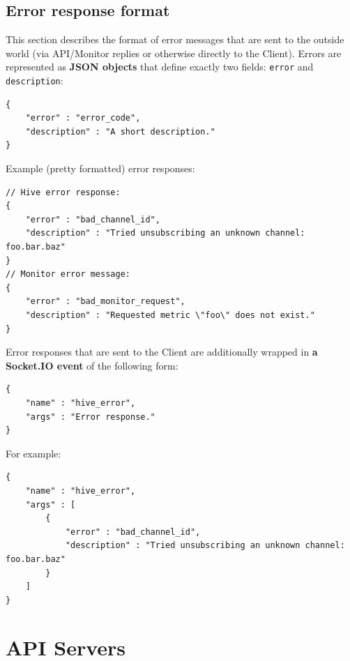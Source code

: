 \documentclass[a4paper]{article}
\begin{document}
\subsection{Error response format}
\label{sec-5-4}
\label{ref-error_format}

This section describes the format of error messages that are sent to the outside world (via API/Monitor replies or otherwise directly to the Client). Errors are represented as \textbf{JSON objects} that define exactly two fields: \texttt{error} and \texttt{description}:


\begin{verbatim}
{
    "error" : "error_code",
    "description" : "A short description."
}
\end{verbatim}




\noindent
Example (pretty formatted) error responses:


\begin{verbatim}
// Hive error response:
{
    "error" : "bad_channel_id",
    "description" : "Tried unsubscribing an unknown channel: foo.bar.baz"
}
// Monitor error message:
{
    "error" : "bad_monitor_request",
    "description" : "Requested metric \"foo\" does not exist."
}
\end{verbatim}




\noindent
Error responses that are sent to the Client are additionally wrapped in \textbf{a Socket.IO event} of the following form:


\begin{verbatim}
{
    "name" : "hive_error",
    "args" : "Error response."
}
\end{verbatim}




\noindent
For example:


\begin{verbatim}
{
    "name" : "hive_error",
    "args" : [
        {
            "error" : "bad_channel_id",
            "description" : "Tried unsubscribing an unknown channel: foo.bar.baz"
        }
    ]
}
\end{verbatim}




\pagebreak
\section{API Servers}
\label{sec-6}
\label{ref-hive_api}
\end{document}
